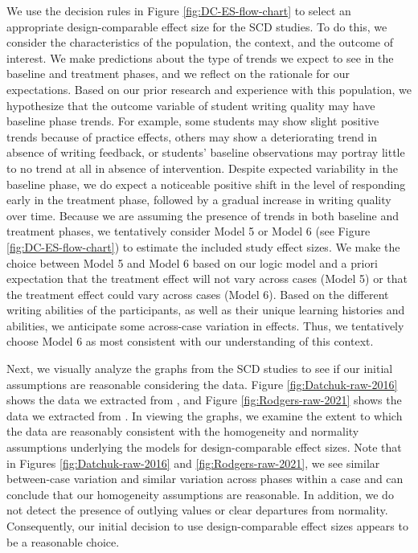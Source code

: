 \documentclass[
]{book}
\begin{document}
We use the decision rules in Figure \ref{fig:DC-ES-flow-chart} to select an appropriate design-comparable effect size for the SCD studies. To do this, we consider the characteristics of the population, the context, and the outcome of interest. We make predictions about the type of trends we expect to see in the baseline and treatment phases, and we reflect on the rationale for our expectations. Based on our prior research and experience with this population, we hypothesize that the outcome variable of student writing quality may have baseline phase trends. For example, some students may show slight positive trends because of practice effects, others may show a deteriorating trend in absence of writing feedback, or students' baseline observations may portray little to no trend at all in absence of intervention. Despite expected variability in the baseline phase, we do expect a noticeable positive shift in the level of responding early in the treatment phase, followed by a gradual increase in writing quality over time. Because we are assuming the presence of trends in both baseline and treatment phases, we tentatively consider Model 5 or Model 6 (see Figure \ref{fig:DC-ES-flow-chart}) to estimate the included study effect sizes. We make the choice between Model 5 and Model 6 based on our logic model and a priori expectation that the treatment effect will not vary across cases (Model 5) or that the treatment effect could vary across cases (Model 6). Based on the different writing abilities of the participants, as well as their unique learning histories and abilities, we anticipate some across-case variation in effects. Thus, we tentatively choose Model 6 as most consistent with our understanding of this context.

Next, we visually analyze the graphs from the SCD studies to see if our initial assumptions are reasonable considering the data. Figure \ref{fig:Datchuk-raw-2016} shows the data we extracted from \citet{datchuk2016Writing}, and Figure \ref{fig:Rodgers-raw-2021} shows the data we extracted from \citet{rodgers2021Effects}.
In viewing the graphs, we examine the extent to which the data are reasonably consistent with the homogeneity and normality assumptions underlying the models for design-comparable effect sizes. Note that in Figures \ref{fig:Datchuk-raw-2016} and \ref{fig:Rodgers-raw-2021}, we see similar between-case variation and similar variation across phases within a case and can conclude that our homogeneity assumptions are reasonable. In addition, we do not detect the presence of outlying values or clear departures from normality. Consequently, our initial decision to use design-comparable effect sizes appears to be a reasonable choice.
\end{document}
